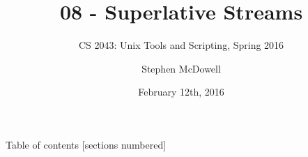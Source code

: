 %
%
%
%


%
%
\title{08 \-- Superlative Streams}
\subtitle{CS 2043: Unix Tools and Scripting, Spring 2016 \cite{prevSemesters}}
\date{February 12th, 2016}
\author{Stephen McDowell}


\maketitle

\begin{frame}{Table of contents}
  [sections numbered]
  \tableofcontents[hideallsubsections]
\end{frame}

